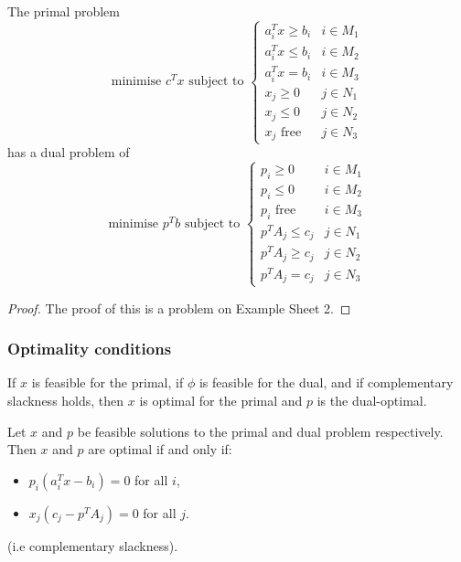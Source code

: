 \documentclass[egregdoesnotlikesansseriftitles,a4paper]{scrartcl}
\begin{document}
\begin{proposition}
	 The primal problem 
	 \begin{equation*}
		  \text{minimise } c^Tx \text{ subject to } 
		  \begin{cases}
			  a_i^T x \geq b_i & i \in M_1 \\ 
			  a_i^T x \leq b_i & i \in M_2 \\ 
			  a_i^T x = b_i & i \in M_3 \\ 
			  x_j \geq 0 & j \in N_1\\
			  x_j \leq 0 & j \in N_2\\
			  x_j \text{ free } & j \in N_3
		  \end{cases}  
	 \end{equation*}
	 has a dual problem of 
	 \begin{equation*}
		\text{minimise } p^T b \text{ subject to } 
		\begin{cases}
			p_i \geq 0 & i \in M_1 \\ 
			p_i \leq 0 & i \in M_2 \\ 
			p_i \text{ free } & i \in M_3 \\ 
			p^T A_j \leq c_j & j \in N_1\\
			p^T A_j \geq c_j & j \in N_2\\
			p^T A_j = c_j & j \in N_3
		\end{cases}  
   \end{equation*}
\end{proposition}
\begin{proof}
	 The proof of this is a problem on Example Sheet 2.
\end{proof}
\subsubsection{Optimality conditions}
If $x$ is feasible for the primal, if $\phi$ is feasible for the dual, and if complementary slackness holds, then $x$ is optimal for the primal and $p$ is the dual-optimal.

\begin{theorem}
	 Let $x$ and $p$ be feasible solutions to the primal and dual problem respectively. Then $x$ and $p$ are optimal if and only if:
	 \begin{itemize}
		 \item $p_i (a_i^T x - b_i) =0 $ for all $i$,
		 \item $x_j(c_j-p^T A_j)=0$ for all $j$.
	 \end{itemize}
	 (i.e complementary slackness).
\end{theorem}
\end{document}
